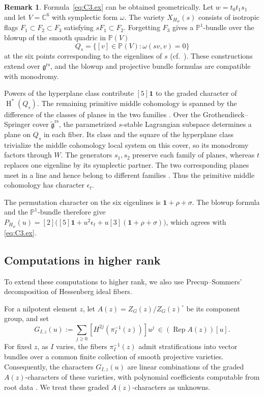 \documentclass[11pt]{amsart}
\numberwithin{equation}{section}
\theoremstyle{definition}
\newtheorem{remark}[theorem]{Remark}
\newcommand\grs{\mathfrak{g}^{\mathrm{rs}}}
\newcommand\tgrs{\widetilde{\mathfrak{g}}^{\mathrm{rs}}}
\DeclareMathOperator{\Rep}{\mathrm{Rep}}
\DeclareMathOperator{\coh}{\mathrm{H}}
\def\C{\mathbb{C}}
\def\PP{\mathbb{P}}
\begin{document}
\begin{remark}\label{rem:C3.blowup}
Formula~\eqref{eq:C3.ex} can be obtained geometrically. %
Let $w=t_0t_1s_1$ and let $V=\C^6$ with symplectic form $\omega$.
The variety $X_{H_w}(s)$ consists of isotropic flags $F_1\subset F_2\subset F_3$ satisfying $sF_1\subset F_2$.
Forgetting $F_3$ gives a $\PP^1$-bundle over the blowup of the smooth quadric in $\PP(V)$
\[
Q_s=\{[v]\in\PP(V):\omega(sv,v)=0\} 
\]
at the six points corresponding to the eigenlines of $s$ (cf.~\cite{kiem-lee}).
These constructions extend over $\grs$, and the blowup and projective bundle formulas are compatible with monodromy.

Powers of the hyperplane class contribute $[5]\mathbf1$ to the graded character of $\coh^*(Q_s)$.
The remaining primitive middle cohomology is spanned by the difference of the classes of planes in the two families \cite[Theorem~1.13]{Reid72}.
Over the Grothendieck--Springer cover $\tgrs$, the parametrized $s$-stable Lagrangian subspace determines a plane on $Q_s$ in each fiber.
Its class and the square of the hyperplane class trivialize the middle cohomology local system on this cover, so its monodromy factors through $W$.
The generators $s_1,s_2$ preserve each family of planes, whereas $t$ replaces one eigenline by its symplectic partner.
The two corresponding planes meet in a line and hence belong to different families \cite[Theorem~1.2(b)]{Reid72}.
Thus the primitive middle cohomology has character $\epsilon_t$.

The permutation character on the six eigenlines is $\mathbf1+\rho+\sigma$.
The blowup formula and the $\PP^1$-bundle therefore give
$P_{H_w}(u)=[2]\big([5]\mathbf1+u^2\epsilon_t+u[3](\mathbf1+\rho+\sigma)\big)$,
which agrees with \eqref{eq:C3.ex}.
\end{remark}







\subsection{Computations in higher rank}
\label{ss:higher.rank}

To extend these computations to higher rank, we also use Precup--Sommers' decomposition of Hessenberg ideal fibers.

For a nilpotent element $z$, let $A(z)=Z_G(z)/Z_G(z)^\circ$ be its component group, and set
\[
G_{I,z}(u):=\sum_{j\geq0}[H^{2j}(\pi_I^{-1}(z))]u^j~\in(\Rep A(z))[u].
\]
For fixed $z$, as $I$ varies, the fibers $\pi_I^{-1}(z)$ admit stratifications into vector bundles over a common finite collection of smooth projective varieties.
Consequently, the characters $G_{I,z}(u)$ are linear combinations of the graded $A(z)$-characters of these varieties, with polynomial coefficients computable from root data \cite[Proposition~3.3 and Corollary~3.8]{PS}.
We treat these graded $A(z)$-characters as unknowns.
\end{document}
